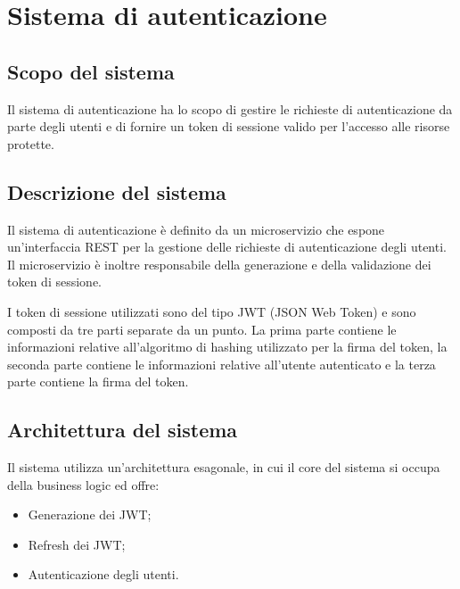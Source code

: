 \chapter{Sistema di autenticazione}


\section{Scopo del sistema}

Il sistema di autenticazione ha lo scopo di gestire le richieste di autenticazione da parte degli utenti e di fornire un token di sessione valido per l'accesso alle risorse protette.

\section{Descrizione del sistema}

Il sistema di autenticazione è definito da un microservizio che espone un'interfaccia REST per la gestione delle richieste di autenticazione degli utenti. Il microservizio è inoltre responsabile della generazione e della validazione dei token di sessione.

I token di sessione utilizzati sono del tipo JWT (JSON Web Token) e sono composti da tre parti separate da un punto. La prima parte contiene le informazioni relative all'algoritmo di hashing utilizzato per la firma del token, la seconda parte contiene le informazioni relative all'utente autenticato e la terza parte contiene la firma del token.

\section{Architettura del sistema}

Il sistema utilizza un'architettura esagonale, in cui il core del sistema si occupa della business logic ed offre:
\begin{itemize}
    \item Generazione dei JWT;
    \item Refresh dei JWT;
    \item Autenticazione degli utenti.
\end{itemize}

